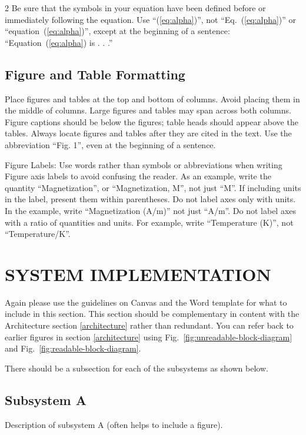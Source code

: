 \documentclass[10pt]{article}
\begin{document}
\begin{multicols*}{2}
Be sure that the symbols in your equation have been defined before or immediately following the equation. Use ``(\ref{eq:alpha})”, not ``Eq.~(\ref{eq:alpha})” or ``equation~(\ref{eq:alpha})”, except at the beginning of a sentence: ``Equation~(\ref{eq:alpha}) is . . .”

\subsection{Figure and Table Formatting}
Place figures and tables at the top and bottom of columns. Avoid placing them in the 
middle of columns. Large figures and tables may span across both columns. Figure 
captions should be below the figures; table heads should appear above the tables. 
Always locate figures and tables after they are cited in the text. Use the abbreviation 
“Fig. 1”, even at the beginning of a sentence.

Figure Labels: Use words rather than symbols or abbreviations when writing Figure 
axis labels to avoid confusing the reader. As an example, write the quantity
“Magnetization”, or “Magnetization, M”, not just “M”. If including units in the 
label, present them within parentheses. Do not label axes only with units. 
In the example, write “Magnetization (A/m)” not just “A/m”. Do not label axes 
with a ratio of quantities and units. For example, write “Temperature (K)”, 
not “Temperature/K”.

\section{SYSTEM IMPLEMENTATION} \label{system-implementation}
Again please use the guidelines on Canvas and the Word template for what to include in this section. This section should be complementary in content with the Architecture 
section \ref{architecture} rather than redundant. You can refer back to earlier figures in section \ref{architecture} using Fig.~\ref{fig:unreadable-block-diagram} and Fig.~\ref{fig:readable-block-diagram}.

There should be a subsection for each of the subsystems as shown below.
\subsection{Subsystem A}
Description of subsystem A (often helps to include a figure).


\end{multicols*}
\end{document}
